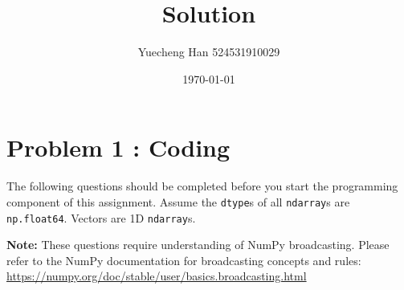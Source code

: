 \documentclass[11pt,addpoints,answers]{exam}
\title{\textbf{Solution}}
\author{Yuecheng Han 524531910029}
\date{\today}
\begin{document}
	\maketitle
	
	\section*{Problem 1 : Coding}
	\label{sec:pseudocode}
	
	The following questions should be completed before you start the programming component of this assignment. Assume the \texttt{dtype}s of all \texttt{ndarray}s are \texttt{np.float64}. Vectors are 1D \texttt{ndarray}s.
	
	\textbf{Note:} These questions require understanding of NumPy broadcasting. Please refer to the NumPy documentation for broadcasting concepts and rules: \url{https://numpy.org/doc/stable/user/basics.broadcasting.html}
	
\end{document}
